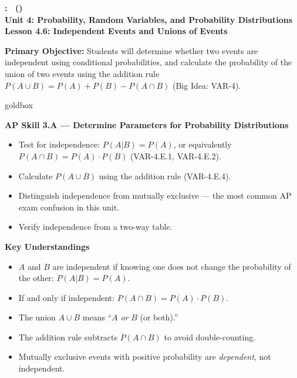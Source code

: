 \documentclass[10pt]{article}
\newcommand{\UnitNumberName}{Unit 4: Probability, Random Variables, and Probability Distributions \quad}
\newcommand{\LessonNumberName}{Lesson 4.6: Independent Events and Unions of Events}
\begin{document}
\begin{center}
    {\Large\bfseries \CourseName: \SchoolYear\ (\MeetingLength) \\
    {\small\bfseries \UnitNumberName \LessonNumberName}}
\end{center}

\begin{tcolorbox}[colback=sky, colframe=navy, boxrule=0.9pt, arc=2mm,
    left=2mm, right=2mm, top=1.5mm, bottom=1.5mm]
    \textbf{Primary Objective:} Students will determine whether two events are
    independent using conditional probabilities, and calculate the probability of
    the union of two events using the addition rule $P(A \cup B) = P(A) + P(B) - P(A \cap B)$
    (Big Idea: VAR-4).
\end{tcolorbox}

\renewcommand{\arraystretch}{1.6}
\begin{skillbox}{goldbox}
\begin{minipage}[t]{0.48\linewidth}
    \textbf{AP Skill 3.A --- Determine Parameters for Probability Distributions}
    \begin{itemize}
        \item Test for independence: $P(A|B) = P(A)$, or equivalently
              $P(A \cap B) = P(A) \cdot P(B)$ (VAR-4.E.1, VAR-4.E.2).
        \item Calculate $P(A \cup B)$ using the addition rule (VAR-4.E.4).
        \item Distinguish independence from mutually exclusive --- the most
              common AP exam confusion in this unit.
        \item Verify independence from a two-way table.
    \end{itemize}
\end{minipage}
\hfill
\begin{minipage}[t]{0.48\linewidth}
    \textbf{Key Understandings}
    \begin{itemize}
        \item $A$ and $B$ are independent if knowing one does not change the
              probability of the other: $P(A|B) = P(A)$.
        \item If and only if independent: $P(A \cap B) = P(A) \cdot P(B)$.
        \item The union $A \cup B$ means ``$A$ \emph{or} $B$ (or both).''
        \item The addition rule subtracts $P(A \cap B)$ to avoid double-counting.
        \item Mutually exclusive events with positive probability are \emph{dependent},
              not independent.
    \end{itemize}
\end{minipage}
\end{skillbox}
\end{document}
